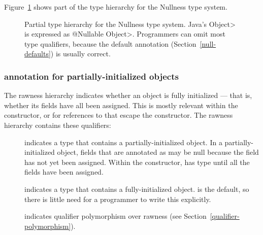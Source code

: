 Figure~\ref{fig:nonnull-hierarchy} shows part of the type hierarchy for the
Nullness type system.


\begin{figure}
\begin{center}
\end{center}
\vspace{-1.5\baselineskip}
\caption{Partial type hierarchy for the Nullness type system.
Java's \<Object> is expressed as \<@Nullable Object>.  Programmers can omit
most type qualifiers, because the default annotation
(Section~\ref{null-defaults}) is usually correct.}
\label{fig:nonnull-hierarchy}
\end{figure}


\subsubsection{ annotation for partially-initialized objects\label{raw-partially-initialized}}

The rawness hierarchy indicates whether an object is fully initialized ---
that is, whether its fields have all been assigned.  This is mostly
relevant within the constructor, or for references to  that
escape the constructor.  The rawness hierarchy contains these qualifiers:

\begin{description}

\item[]
  indicates a type that contains a partially-initialized object.  In a
  partially-initialized object, fields that are annotated as
   may be null because the field
  has not yet been assigned.  Within the constructor,
   has  type until all
  the fields have been assigned.

\item[]
  indicates a type that contains a fully-initialized object.  
  is the default, so there is little need for a programmer to write this
  explicitly.

\item[]
  indicates qualifier polymorphism over rawness (see
  Section~\ref{qualifier-polymorphism}).

\end{description}

